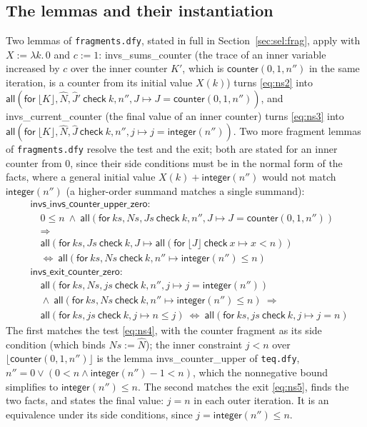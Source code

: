 \documentclass[11pt,a4paper]{article}
\newcommand{\bl}[1]{\lfloor #1\rfloor}                       %
\newcommand{\al}[2]{\mathsf{all}(\mathsf{for}\ #1\ \mathsf{check}\ #2)}
\newcommand{\cnt}{\mathsf{counter}}
\newcommand{\intf}{\mathsf{integer}}
\newcommand{\lemma}[1]{\textsf{#1}}
\newcommand{\seq}[1]{\hat{#1}}                               %
\begin{document}
\subsection{The lemmas and their instantiation}
Two lemmas of \texttt{fragments.dfy}, stated in full in Section~\ref{sec:sel:frag}, apply with
$X := \lambda k.\, 0$ and $c := 1$: \lemma{invs\_sums\_counter} (the trace of an inner variable increased
by $c$ over the inner counter $K'$, which is $\cnt(0, 1, n'')$ in the same iteration, is a counter from
its initial value $X(k)$) turns \eqref{eq:ns2} into
$\al{\bl{K}, \seq{N}, \seq{J}'}{k, n'', J \mapsto J = \cnt(0, 1, n'')}$, and
\lemma{invs\_current\_counter} (the final value of an inner counter) turns \eqref{eq:ns3} into
$\al{\bl{K}, \seq{N}, \seq{J}}{k, n'', j \mapsto j = \intf(n'')}$. Two more fragment lemmas of
\texttt{fragments.dfy} resolve the test and the exit; both are stated for an inner counter from $0$,
since their side conditions must be in the normal form of the facts, where a general initial value
$X(k) + \intf(n'')$ would not match $\intf(n'')$ (a higher-order summand matches a single summand):
\begin{align*}
  &\lemma{invs\_invs\_counter\_upper\_zero}:\\
  &\quad 0 \le n\ \wedge\ \al{ks, Ns, Js}{k, n'', J \mapsto J = \cnt(0, 1, n'')}\\
  &\quad\Longrightarrow\\
  &\quad \al{ks, Js}{k, J \mapsto \al{\bl{J}}{x \mapsto x < n}}\\
  &\quad\Longleftrightarrow\ \al{ks, Ns}{k, n'' \mapsto \intf(n'') \le n}\\[4pt]
  &\lemma{invs\_exit\_counter\_zero}:\\
  &\quad \al{ks, Ns, js}{k, n'', j \mapsto j = \intf(n'')}\\
  &\quad\wedge\ \al{ks, Ns}{k, n'' \mapsto \intf(n'') \le n}\ \Longrightarrow\\
  &\quad \al{ks, js}{k, j \mapsto n \le j}\ \Longleftrightarrow\ \al{ks, js}{k, j \mapsto j = n}
\end{align*}
The first matches the test \eqref{eq:ns4}, with the counter fragment as its side condition (which binds
$Ns := \seq{N}$); the inner constraint $j < n$ over $\bl{\cnt(0, 1, n'')}$ is the lemma
\lemma{invs\_counter\_upper} of \texttt{teq.dfy}, $n'' = 0 \vee (0 < n \wedge \intf(n'') - 1 < n)$,
which the nonnegative bound simplifies to $\intf(n'') \le n$. The second matches the exit
\eqref{eq:ns5}, finds the two facts, and states the final value: $j = n$ in each outer iteration. It is
an equivalence under its side conditions, since $j = \intf(n'') \le n$.
\end{document}
